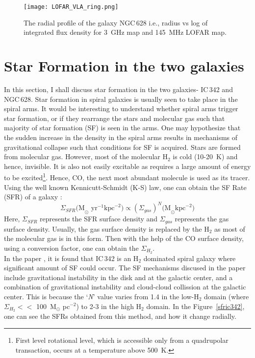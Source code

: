 \documentclass[../main/thesis_msc.tex]{subfiles}
\begin{document}
\begin{figure}
\centering
\texttt{[image: LOFAR\_VLA\_ring.png]}
\caption{The radial profile of the galaxy NGC\,628 i.e., radius vs log of integrated flux density for 3~GHz map \citep{2017A&A...600A...6M} and 145~MHz LOFAR map.}
\label{ngc_ring}
\end{figure}

\section{Star Formation in the two galaxies}
In this section, I shall discuss star formation in the two galaxies- IC\,342 and NGC\,628. Star formation in spiral galaxies is usually seen to take place in the spiral arms. It would be interesting to understand whether spiral arms trigger star formation, or if they rearrange the stars and molecular gas such that majority of star formation (SF) is seen in the arms. One may hypothesize that the sudden increase in the density in the spiral arms results in mechanisms of gravitational collapse such that conditions for SF is acquired. Stars are formed from molecular gas. However, most of the molecular H$_2$ is cold (10-20~K) and hence, invisible. It is also not easily excitable as requires a large amount of energy to be excited\footnote{First level rotational level, which is accessible only from a quadrupolar transaction, occurs at a temperature above 500~K.}. Hence, CO, the next most abundant molecule is used as its tracer. Using the well known Kennicutt-Schmidt (K-S) law, one can obtain the SF Rate (SFR) of a galaxy \citep{1959ApJ...129..243S}:
\begin{equation}
\Sigma_{SFR} \textrm{(M}_\odot\textrm{ yr}^{-1} \textrm{kpc}^{-2}) \propto (\Sigma_{gas})^N \textrm{(M}_\odot \textrm{kpc}^{−2})
\end{equation}
Here, $\Sigma_{SFR}$ represents the  SFR surface density and $\Sigma_{gas}$ represents the gas surface density. Usually, the gas surface density is replaced by the H$_2$ as most of the molecular gas is in this form. Then with the help of the CO surface density, using a conversion factor, one can obtain the $\Sigma_{H_2}$.\\
\noindent In the paper \citet{2014PASJ...66...27P}, it is found that IC\,342 is an H$_2$ dominated spiral galaxy where significant amount of SF could occur. The SF mechanisms discused in the paper include gravitational instability in the disk and at the galactic center, and a combination of gravitational instability and cloud-cloud collission at the galactic center. This is because the `\textit{N}' value varies from 1.4 in the low-H$_2$ domain (where $\Sigma_{H_2} <<$ 100~M$_{\odot}$ pc$^{-2}$) to 2-3 in the high H$_2$ domain. In the Figure\ \ref{sfric342}, one can see the SFRs obtained from this method, and how it change radially. 
\end{document}

